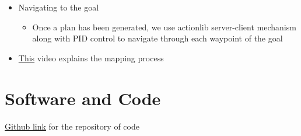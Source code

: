 \documentclass[a4paper,12pt,oneside]{book}
\begin{document}
\begin{itemize}
	\item Navigating to the goal
		\begin{itemize}
			\item Once a plan has been generated, we use actionlib server-client mechanism along with PID control to navigate through each waypoint of the goal
		\end{itemize}
		
	\item \href{https://youtu.be/Ow4pZlDPhkY}{This} video explains the mapping process			
	
\end{itemize}

\section{Software and Code}
\href{https://github.com/eYSIP-2017/eYSIP-2017_Indoor-Environments-Mapping-using-UAV}{Github link} for the repository of code
\end{document}
